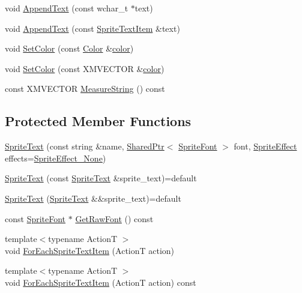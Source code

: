 \begin{DoxyCompactItemize}
void \hyperlink{classmage_1_1_sprite_text_a462809b9138f94720f972505a4f74d81}{Append\+Text} (const wchar\+\_\+t $\ast$text)
\item 
void \hyperlink{classmage_1_1_sprite_text_a6f0bb93c634d9b05466d3998bcaf957a}{Append\+Text} (const \hyperlink{structmage_1_1_sprite_text_item}{Sprite\+Text\+Item} \&text)
\item 
void \hyperlink{classmage_1_1_sprite_text_acaeb6686d0a5d89d799dd3ac4390a242}{Set\+Color} (const \hyperlink{structmage_1_1_color}{Color} \&\hyperlink{namespacemage_a56eceea5a9bceb2b56073f3ea4945781}{color})
\item 
void \hyperlink{classmage_1_1_sprite_text_ab3930318d6dca0589de4490ed629a3b8}{Set\+Color} (const X\+M\+V\+E\+C\+T\+OR \&\hyperlink{namespacemage_a56eceea5a9bceb2b56073f3ea4945781}{color})
\item 
const X\+M\+V\+E\+C\+T\+OR \hyperlink{classmage_1_1_sprite_text_a72f926162887270cef780251561a2155}{Measure\+String} () const
\end{DoxyCompactItemize}
\subsection*{Protected Member Functions}
\begin{DoxyCompactItemize}
\item 
\hyperlink{classmage_1_1_sprite_text_a929b24bba456bfd37a9ebf04db88d4c5}{Sprite\+Text} (const string \&name, \hyperlink{namespacemage_a1e01ae66713838a7a67d30e44c67703e}{Shared\+Ptr}$<$ \hyperlink{classmage_1_1_sprite_font}{Sprite\+Font} $>$ font, \hyperlink{namespacemage_a9cfe18123066ba4236f548f9de75d881}{Sprite\+Effect} effects=\hyperlink{namespacemage_a9cfe18123066ba4236f548f9de75d881af3c275fbfacfe174da928b2f24dfa515}{Sprite\+Effect\+\_\+\+None})
\item 
\hyperlink{classmage_1_1_sprite_text_a76ee01b719ee90418740a2c10392acae}{Sprite\+Text} (const \hyperlink{classmage_1_1_sprite_text}{Sprite\+Text} \&sprite\+\_\+text)=default
\item 
\hyperlink{classmage_1_1_sprite_text_ab569dfa4ff5a30f0a23005c43635aad7}{Sprite\+Text} (\hyperlink{classmage_1_1_sprite_text}{Sprite\+Text} \&\&sprite\+\_\+text)=default
\item 
const \hyperlink{classmage_1_1_sprite_font}{Sprite\+Font} $\ast$ \hyperlink{classmage_1_1_sprite_text_ab67ba17af1b19766343d04f10853c8d6}{Get\+Raw\+Font} () const
\item 
{\footnotesize template$<$typename ActionT $>$ }\\void \hyperlink{classmage_1_1_sprite_text_af1236ba7c80c61be058a21ef1d4c483d}{For\+Each\+Sprite\+Text\+Item} (ActionT action)
\item 
{\footnotesize template$<$typename ActionT $>$ }\\void \hyperlink{classmage_1_1_sprite_text_ab8576580e5b3c0bb568c1256a0b989bc}{For\+Each\+Sprite\+Text\+Item} (ActionT action) const
\end{DoxyCompactItemize}
